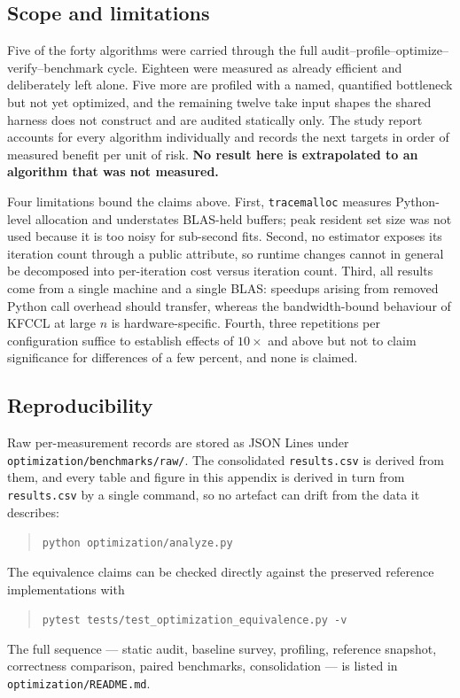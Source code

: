 \subsection{Scope and limitations}
\label{app:opt:scope}

Five of the forty algorithms were carried through the full
audit--profile--optimize--verify--benchmark cycle. Eighteen were measured
as already efficient and deliberately left alone. Five more are profiled
with a named, quantified bottleneck but not yet optimized, and the
remaining twelve take input shapes the shared harness does not construct
and are audited statically only. The study report accounts for every
algorithm individually and records the next targets in order of measured
benefit per unit of risk. \textbf{No result here is extrapolated to an
algorithm that was not measured.}

Four limitations bound the claims above. First, \texttt{tracemalloc}
measures Python-level allocation and understates BLAS-held buffers; peak
resident set size was not used because it is too noisy for sub-second
fits. Second, no estimator exposes its iteration count through a public
attribute, so runtime changes cannot in general be decomposed into
per-iteration cost versus iteration count. Third, all results come from a
single machine and a single BLAS: speedups arising from removed Python
call overhead should transfer, whereas the bandwidth-bound behaviour of
KFCCL at large $n$ is hardware-specific. Fourth, three repetitions per
configuration suffice to establish effects of $10\times$ and above but
not to claim significance for differences of a few percent, and none is
claimed.

\subsection{Reproducibility}
\label{app:opt:repro}

Raw per-measurement records are stored as JSON Lines under
\texttt{optimization/benchmarks/raw/}. The consolidated
\texttt{results.csv} is derived from them, and every table and figure in
this appendix is derived in turn from \texttt{results.csv} by a single
command, so no artefact can drift from the data it describes:

\begin{quote}
\texttt{python optimization/analyze.py}
\end{quote}

The equivalence claims can be checked directly against the preserved
reference implementations with

\begin{quote}
\texttt{pytest tests/test\_optimization\_equivalence.py -v}
\end{quote}

\noindent The full sequence --- static audit, baseline survey, profiling,
reference snapshot, correctness comparison, paired benchmarks,
consolidation --- is listed in \texttt{optimization/README.md}.
